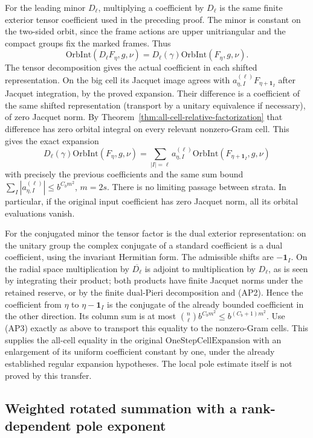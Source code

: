 For the leading minor \(D_\ell\), multiplying a
coefficient by \(D_\ell\) is the same finite exterior
tensor coefficient used in the preceding proof.
The minor is constant on the two-sided orbit, since
the frame actions are upper unitriangular and the
compact groups fix the marked frames. Thus
\[
 \mathrm{OrbInt}(D_\ell F_\eta,g,\nu)
            =D_\ell(\gamma)\mathrm{OrbInt}(F_\eta,g,\nu).
\]
The tensor decomposition gives the actual coefficient
in each shifted representation. On the big cell its
Jacquet image agrees with \(a_{\eta,I}^{(\ell)}F_{\eta+\mathbf1_I}\)
after Jacquet integration, by the proved expansion.
Their difference is a coefficient of the same shifted
representation (transport by a unitary equivalence
if necessary), of zero Jacquet norm. By
Theorem~\ref{thm:all-cell-relative-factorization}
that difference has zero orbital integral on every
relevant nonzero-Gram cell. This gives the exact
expansion
\[
 D_\ell(\gamma)\mathrm{OrbInt}(F_\eta,g,\nu)
 =\sum_{|I|=\ell}a_{\eta,I}^{(\ell)}
             \mathrm{OrbInt}(F_{\eta+\mathbf1_I},g,\nu)
                                                        \tag{AP5}
\]
with precisely the previous coefficients and the same
sum bound \(\sum_I|a_{\eta,I}^{(\ell)}|\le b^{C_bm^2}\),
\(m=2s\). There is no limiting passage between strata.
In particular, if the original input coefficient has
zero Jacquet norm, all its orbital evaluations vanish.

For the conjugated minor the tensor factor is the
dual exterior representation: on the unitary group
the complex conjugate of a standard coefficient
is a dual coefficient, using the invariant Hermitian
form. The admissible shifts are \(-\mathbf1_I\).
On the radial space multiplication by
\(\overline{D_\ell}\) is adjoint to multiplication by
\(D_\ell\), as is seen by integrating their product;
both products have finite Jacquet norms under the
retained reserve, or by the finite dual-Pieri
decomposition and (AP2). Hence the coefficient from
\(\eta\) to \(\eta-\mathbf1_I\) is the conjugate of
the already bounded coefficient in the other
direction. Its column sum is at most
\(\binom n\ell b^{C_bm^2}\le b^{(C_b+1)m^2}\).
Use (AP3) exactly as above to transport this equality
to the nonzero-Gram cells. This supplies the
all-cell equality in the original
\(\mathrm{OneStepCellExpansion}\) with an enlargement
of its uniform coefficient constant by one, under the
already established regular expansion hypotheses.
The local pole estimate itself is not proved by
this transfer.

\subsection{Weighted rotated summation with a rank-dependent pole exponent}
\label{sec:rank-dependent-rotated-sum}

